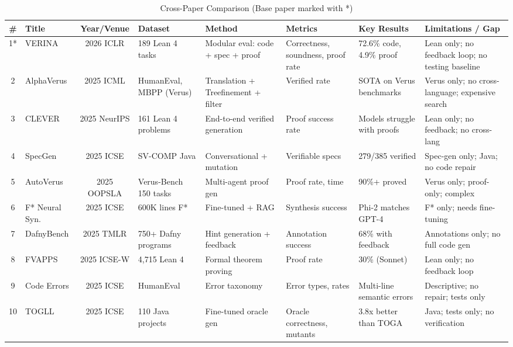 \documentclass[11pt,a4paper]{article}
\begin{document}
\begin{table}[H]
\centering
\caption{Cross-Paper Comparison (Base paper marked with *)}
\label{tab:comparison}
\scriptsize
\begin{tabularx}{\textwidth}{|c|p{2cm}|c|p{1.8cm}|p{2cm}|p{1.5cm}|p{1.5cm}|p{2cm}|}
\hline
\textbf{\#} & \textbf{Title} & \textbf{Year/Venue} & \textbf{Dataset} & \textbf{Method} & \textbf{Metrics} & \textbf{Key Results} & \textbf{Limitations / Gap} \\
\hline
1* & VERINA \cite{verina2026} & 2026 ICLR & 189 Lean 4 tasks & Modular eval: code + spec + proof & Correctness, soundness, proof rate & 72.6\% code, 4.9\% proof & Lean only; no feedback loop; no testing baseline \\
\hline
2 & AlphaVerus \cite{alphaVerus2025} & 2025 ICML & HumanEval, MBPP (Verus) & Translation + Treefinement + filter & Verified rate & SOTA on Verus benchmarks & Verus only; no cross-language; expensive search \\
\hline
3 & CLEVER \cite{clever2025} & 2025 NeurIPS & 161 Lean 4 problems & End-to-end verified generation & Proof success rate & Models struggle with proofs & Lean only; no feedback; no cross-lang \\
\hline
4 & SpecGen \cite{specgen2025} & 2025 ICSE & SV-COMP Java & Conversational + mutation & Verifiable specs & 279/385 verified & Spec-gen only; Java; no code repair \\
\hline
5 & AutoVerus \cite{autoverus2025} & 2025 OOPSLA & Verus-Bench 150 tasks & Multi-agent proof gen & Proof rate, time & 90\%+ proved & Verus only; proof-only; complex \\
\hline
6 & F* Neural Syn. \cite{fstar2025} & 2025 ICSE & 600K lines F* & Fine-tuned + RAG & Synthesis success & Phi-2 matches GPT-4 & F* only; needs fine-tuning \\
\hline
7 & DafnyBench \cite{dafnybench2025} & 2025 TMLR & 750+ Dafny programs & Hint generation + feedback & Annotation success & 68\% with feedback & Annotations only; no full code gen \\
\hline
8 & FVAPPS \cite{fvapps2025} & 2025 ICSE-W & 4,715 Lean 4 & Formal theorem proving & Proof rate & 30\% (Sonnet) & Lean only; no feedback loop \\
\hline
9 & Code Errors \cite{codeerrors2025} & 2025 ICSE & HumanEval & Error taxonomy & Error types, rates & Multi-line semantic errors & Descriptive; no repair; tests only \\
\hline
10 & TOGLL \cite{togll2025} & 2025 ICSE & 110 Java projects & Fine-tuned oracle gen & Oracle correctness, mutants & 3.8x better than TOGA & Java; tests only; no verification \\
\hline
\end{tabularx}
\end{table}
\end{document}
